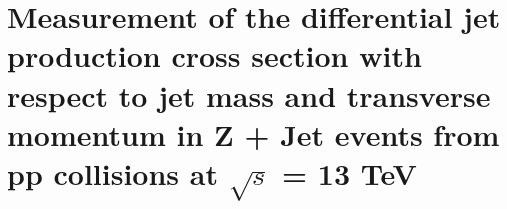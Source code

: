 \chapter{Measurement of the differential jet production cross section with respect to jet mass and transverse momentum in
Z + Jet events from pp collisions at $\sqrt{s}$ = 13 TeV}\label{chap:AN-18-240}
